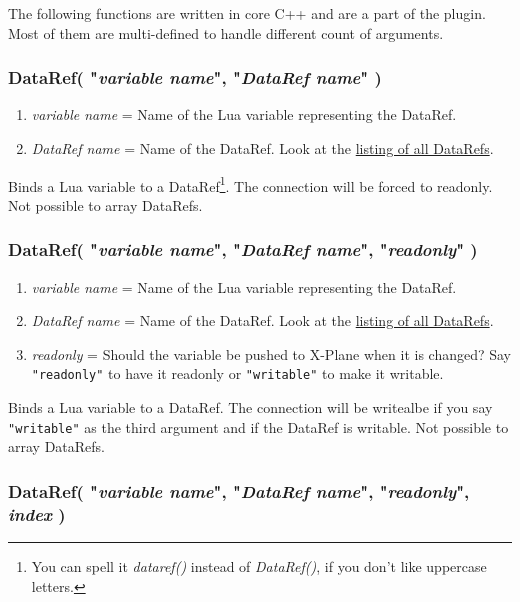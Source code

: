 \documentclass[11pt,parskip=half,a4paper]{scrartcl}
\begin{document}
The following functions are written in core C++ and are a part of the plugin. Most of them are multi-defined to handle different count of arguments.

\subsubsection{DataRef( "\emph{variable name}", "\emph{DataRef name}" )}

\begin{enumerate}
	\item \emph{variable name} = Name of the Lua variable representing the DataRef.
	\item \emph{DataRef name} = Name of the DataRef. Look at the \href{http://www.xsquawkbox.net/xpsdk/docs/DataRefs.html}{listing of all DataRefs}.
\end{enumerate}

Binds a Lua variable to a DataRef\footnote{You can spell it \emph{dataref()} instead of \emph{DataRef()}, if you don't like uppercase letters.}. The connection will be forced to readonly. Not possible to array DataRefs.

\subsubsection{DataRef( "\emph{variable name}", "\emph{DataRef name}", "\emph{readonly}" )}

\begin{enumerate}
	\item \emph{variable name} = Name of the Lua variable representing the DataRef.
	\item \emph{DataRef name} = Name of the DataRef. Look at the \href{http://www.xsquawkbox.net/xpsdk/docs/DataRefs.html}{listing of all DataRefs}.
	\item \emph{readonly} = Should the variable be pushed to X-Plane when it is changed? Say \verb|"readonly"| to have it readonly or \verb|"writable"| to make it writable.
\end{enumerate}

Binds a Lua variable to a DataRef. The connection will be writealbe if you say \verb|"writable"| as the third argument and if the DataRef is writable. Not possible to array DataRefs.

\subsubsection{DataRef( "\emph{variable name}", "\emph{DataRef name}", "\emph{readonly}", \emph{index} )}
\end{document}
